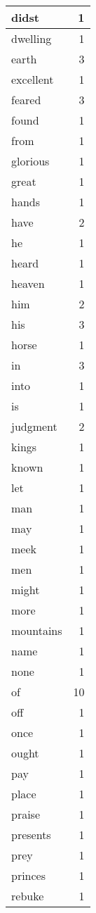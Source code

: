 \begin{center}
\begin{longtable}{l|r}
didst & 1 \\ \hline
dwelling & 1 \\ \hline
earth & 3 \\ \hline
excellent & 1 \\ \hline
feared & 3 \\ \hline
found & 1 \\ \hline
from & 1 \\ \hline
glorious & 1 \\ \hline
great & 1 \\ \hline
hands & 1 \\ \hline
have & 2 \\ \hline
he & 1 \\ \hline
heard & 1 \\ \hline
heaven & 1 \\ \hline
him & 2 \\ \hline
his & 3 \\ \hline
horse & 1 \\ \hline
in & 3 \\ \hline
into & 1 \\ \hline
is & 1 \\ \hline
judgment & 2 \\ \hline
kings & 1 \\ \hline
known & 1 \\ \hline
let & 1 \\ \hline
man & 1 \\ \hline
may & 1 \\ \hline
meek & 1 \\ \hline
men & 1 \\ \hline
might & 1 \\ \hline
more & 1 \\ \hline
mountains & 1 \\ \hline
name & 1 \\ \hline
none & 1 \\ \hline
of & 10 \\ \hline
off & 1 \\ \hline
once & 1 \\ \hline
ought & 1 \\ \hline
pay & 1 \\ \hline
place & 1 \\ \hline
praise & 1 \\ \hline
presents & 1 \\ \hline
prey & 1 \\ \hline
princes & 1 \\ \hline
rebuke & 1 \\ \hline

\end{longtable}
\end{center}
